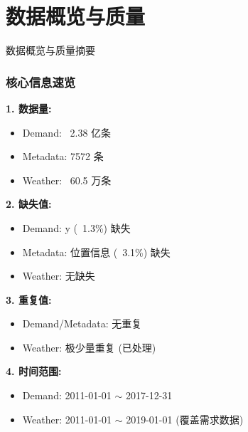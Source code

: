 \documentclass{beamer} %
\begin{document}
\section{数据概览与质量} %

\begin{frame}{数据概览与质量摘要}
    \frametitle{核心信息速览}
    \textbf{1. 数据量:}
    \begin{itemize}
        \item Demand: ~2.38 亿条
        \item Metadata: 7572 条
        \item Weather: ~60.5 万条
    \end{itemize}

    \textbf{2. 缺失值:}
    \begin{itemize}
        \item Demand: y (~1.3\%) 缺失
        \item Metadata: 位置信息 (~3.1\%) 缺失
        \item Weather: 无缺失
    \end{itemize}

    \textbf{3. 重复值:}
    \begin{itemize}
        \item Demand/Metadata: 无重复
        \item Weather: 极少量重复 (已处理)
    \end{itemize}

    \textbf{4. 时间范围:}
    \begin{itemize}
        \item Demand: 2011-01-01 \(\sim\) 2017-12-31
        \item Weather: 2011-01-01 \(\sim\) 2019-01-01 (覆盖需求数据)
    \end{itemize}
\end{frame}
\end{document}
